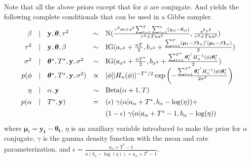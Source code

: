 \documentclass[11pt]{article}
\def\ds{\displaystyle}
\newcommand{\m}[1]{\mathbf{\bm{#1}}} %
\def\ds{\displaystyle}
\begin{document}
\noindent
Note that all the above priors except that for $\phi$ are conjugate. And yields
the following complete conditionals that can be used in a Gibbs sampler.
\[\def\arraystretch{1.4}
  \begin{array}{rclcl}
    \beta &|& \m y, \m\theta, \tau^2  &\sim& \text{N}(
      \frac{\tau^2m + s^2\sum_{t=1}^T\sum_{i=1}^n(y_{it}-\theta_{it})}{\tau^2+Tns^2},
      \frac{s^2\tau^2}{\tau^2+Tns^2}) \\
    \tau^2 &|& \m y, \m\theta, \beta  &\sim& \text{IG}(a_{\tau^2}+\frac{nT}{2},
    b_{\tau^2}+\frac{\sum_{t=1}^T (\m\mu_t-\beta \m1_n)'(\m\mu_t-\beta \m1_n)}{2})\\
    \sigma^2 &|& \m\theta^*, T^*, \m y, \sigma^2 &\sim& \text{IG}(a_{\sigma^2}+\frac{nT^*}{2},
    b_{\sigma^2}+\frac{\sum_{t=1}^{T^*}\m\theta_t^{*'} H_n^{-1}(\phi)\m\theta_t^*}{2})\\
    p(\phi &|& \m\theta^*, T^*, \m y, \sigma^2) &\propto& 
    [\phi]|H_n(\phi)|^{-T^*/2} \exp\left(-\frac{\sum_{t=1}^{T^*}\m\theta_t^{*'} H_n^{-1}(\phi)\m\theta_t^*}{2\sigma^2}\right)\\
    \eta &|& \alpha, \m y &\sim& \text{Beta}(\alpha+1,T)\\
    p(\alpha &|& T^*, \m y) &=& (\epsilon)~\gamma(\alpha | a_\alpha+T^*, b_\alpha-\log(\eta)) +\\
             &&&&(1-\epsilon)~\gamma(\alpha | a_\alpha+T^*-1, b_\alpha-\log(\eta))\\
  \end{array}
\]
where $\m\mu_t=\m{y_t -\theta_t} $, $\eta$ is an auxiliary variable introduced
to make the prior for $\alpha$ conjugate, $\gamma$ is the gamma density
function with the mean and rate parameterization, and 
$\epsilon = \ds\frac{a_\alpha +T^* - 1}{ n(b_\alpha-\log(\eta)) + a_\alpha +T^* -1}$.\\
\end{document}
